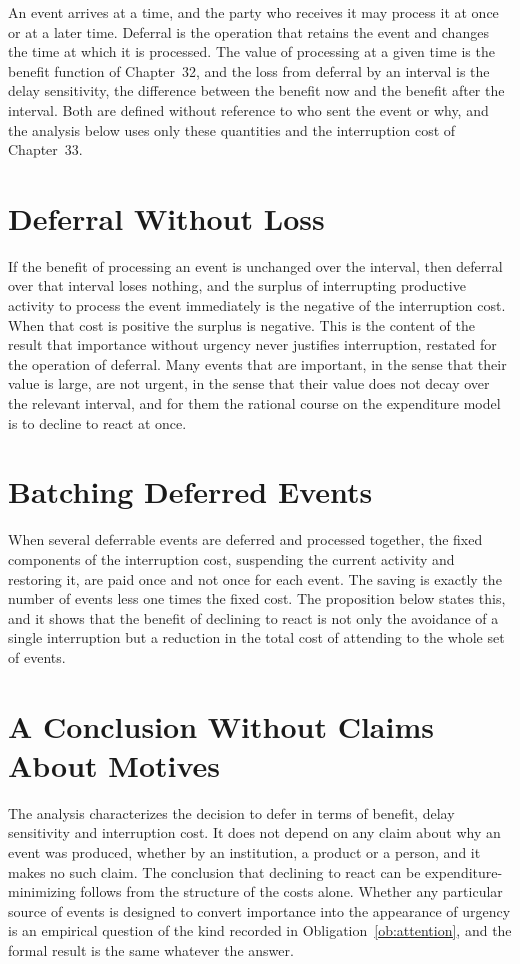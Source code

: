 \documentclass[11pt,letterpaper]{report}
\theoremstyle{plain}
\theoremstyle{definition}
\theoremstyle{remark}
\begin{document}
An event arrives at a time, and the party who receives it may process it at once or at a later time. Deferral is the operation that retains the event and changes the time at which it is processed. The value of processing at a given time is the benefit function of Chapter~32, and the loss from deferral by an interval is the delay sensitivity, the difference between the benefit now and the benefit after the interval. Both are defined without reference to who sent the event or why, and the analysis below uses only these quantities and the interruption cost of Chapter~33.

\section{Deferral Without Loss}

If the benefit of processing an event is unchanged over the interval, then deferral over that interval loses nothing, and the surplus of interrupting productive activity to process the event immediately is the negative of the interruption cost. When that cost is positive the surplus is negative. This is the content of the result that importance without urgency never justifies interruption, restated for the operation of deferral. Many events that are important, in the sense that their value is large, are not urgent, in the sense that their value does not decay over the relevant interval, and for them the rational course on the expenditure model is to decline to react at once.

\section{Batching Deferred Events}

When several deferrable events are deferred and processed together, the fixed components of the interruption cost, suspending the current activity and restoring it, are paid once and not once for each event. The saving is exactly the number of events less one times the fixed cost. The proposition below states this, and it shows that the benefit of declining to react is not only the avoidance of a single interruption but a reduction in the total cost of attending to the whole set of events.

\section{A Conclusion Without Claims About Motives}

The analysis characterizes the decision to defer in terms of benefit, delay sensitivity and interruption cost. It does not depend on any claim about why an event was produced, whether by an institution, a product or a person, and it makes no such claim. The conclusion that declining to react can be expenditure-minimizing follows from the structure of the costs alone. Whether any particular source of events is designed to convert importance into the appearance of urgency is an empirical question of the kind recorded in Obligation~\ref{ob:attention}, and the formal result is the same whatever the answer.
\end{document}
